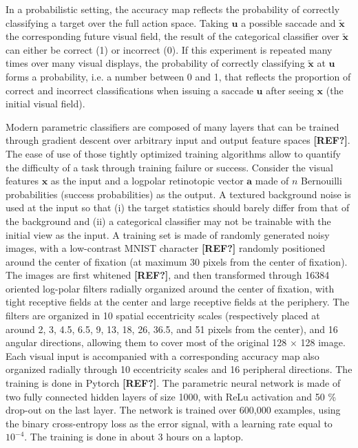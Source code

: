 \CNS In a probabilistic setting, the accuracy map reflects the probability of correctly classifying a target over the full action space. Taking $\boldsymbol{u}$ a possible saccade and $\tilde{\boldsymbol{x}}$ the corresponding future visual field, the result of the categorical classifier over $\tilde{\boldsymbol{x}}$ can either be correct (1) or incorrect (0). If this experiment is repeated many times over many visual displays, the probability of correctly classifying $\tilde{\boldsymbol{x}}$ at $\boldsymbol{u}$ forms a probability, i.e. a number between 0 and 1, that reflects the proportion of correct and incorrect classifications when issuing a saccade $\boldsymbol{u}$ after seeing $\boldsymbol{x}$ (the initial visual field). 
\fi

\CNS
Modern parametric classifiers are composed of many layers that can be trained through gradient descent over arbitrary input and output feature spaces {\bf [REF?]}. The ease of use of those tightly optimized training algorithms allow to quantify the difficulty of a task through training failure or success. Consider the visual features  $\boldsymbol{x}$ as the input and a logpolar retinotopic vector $\boldsymbol{a}$ made of $n$ Bernouilli probabilities (success probabilities) as the output. A textured background noise is used at the input so that (i) the target statistics should barely differ from that of the background and (ii) a  categorical classifier may not be trainable with the initial view as the input. A training set is made of randomly generated noisy images, with a low-contrast MNIST character {\bf [REF?]} randomly positioned around the center of fixation (at maximum 30 pixels from the center of fixation). The images are first whitened {\bf [REF?]}, and then transformed through 16384 oriented log-polar filters radially organized around the center of fixation, with tight receptive fields at the center and large receptive fields at the periphery. The filters are organized in 10 spatial eccentricity scales (respectively placed at around 2, 3, 4.5, 6.5, 9, 13, 18, 26, 36.5, and 51 pixels from the center), and 16 angular directions, allowing them to cover most of the original 128 $\times$ 128 image. Each visual input is accompanied with a corresponding accuracy map also organized radially through 10 eccentricity scales and 16 peripheral directions. The training is done in Pytorch {\bf [REF?]}. The parametric neural network is made of two fully connected hidden layers of size 1000, with ReLu activation and 50 \% drop-out on the last layer. The network is trained over 600,000 examples, using the binary cross-entropy loss as the error signal, with a learning rate equal to $10^{-4}$. The training is done in about 3 hours on a laptop.  


